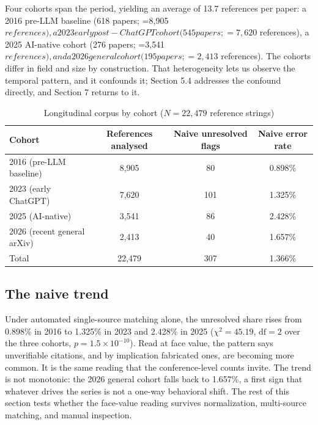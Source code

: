 \documentclass[11pt, a4paper]{article}
\begin{document}
Four cohorts span the period, yielding an average of 13.7 references per paper: a 2016 pre-LLM baseline (618 papers; =8{,}905$ references), a 2023 early post-ChatGPT cohort (545 papers; =7{,}620$ references), a 2025 AI-native cohort (276 papers; =3{,}541$ references), and a 2026 general cohort (195 papers; =2{,}413$ references). The cohorts differ in field and size by construction. That heterogeneity lets us observe the temporal pattern, and it confounds it; Section 5.4 addresses the confound directly, and Section 7 returns to it.

\begin{table}[htbp]
\centering
\caption{Longitudinal corpus by cohort ($N = 22{,}479$ reference strings)}
\label{tab:cohort_breakdown}
\begin{tabular}{lccc}
\toprule
\textbf{Cohort} & \textbf{References analysed} & \textbf{Naive unresolved flags} & \textbf{Naive error rate} \\
\midrule
2016 (pre-LLM baseline) & 8,905 & 80 & 0.898\% \\
2023 (early ChatGPT) & 7,620 & 101 & 1.325\% \\
2025 (AI-native) & 3,541 & 86 & 2.428\% \\
2026 (recent general arXiv) & 2,413 & 40 & 1.657\% \\
\midrule
Total & 22,479 & 307 & 1.366\% \\
\bottomrule
\end{tabular}
\end{table}

\subsection{The naive trend}
Under automated single-source matching alone, the unresolved share rises from 0.898\% in 2016 to 1.325\% in 2023 and 2.428\% in 2025 ($\chi^2 = 45.19$, $\mathrm{df} = 2$ over the three cohorts, $p = 1.5 \times 10^{-10}$). Read at face value, the pattern says unverifiable citations, and by implication fabricated ones, are becoming more common. It is the same reading that the conference-level counts invite. The trend is not monotonic: the 2026 general cohort falls back to 1.657\%, a first sign that whatever drives the series is not a one-way behavioral shift. The rest of this section tests whether the face-value reading survives normalization, multi-source matching, and manual inspection.
\end{document}
